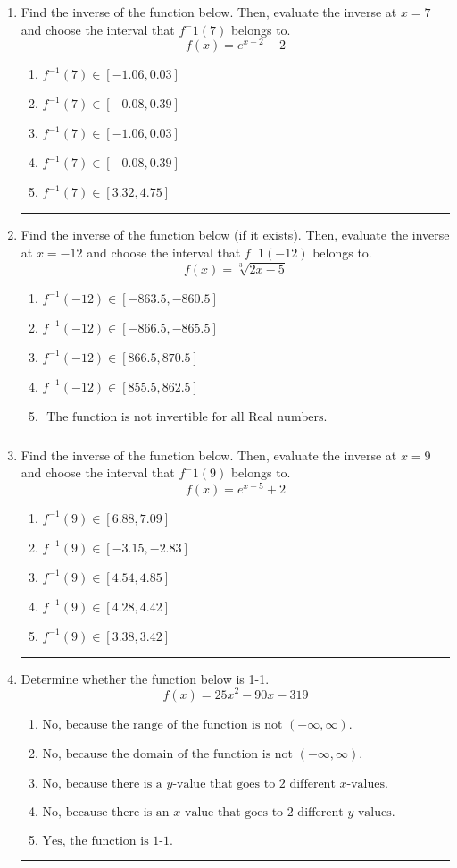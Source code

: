 \documentclass[14pt]{extbook}
\newcommand{\litem}[1]{\item#1\hspace*{-1cm}\rule{\textwidth}{0.4pt}}
\begin{document}
\begin{enumerate}
{\begin{enumerate}[label=\Alph*.]
\end{enumerate} }
\litem{
Find the inverse of the function below. Then, evaluate the inverse at $x = 7$ and choose the interval that $f^-1(7)$ belongs to.\[ f(x) = e^{x-2}-2 \]\begin{enumerate}[label=\Alph*.]
\item \( f^{-1}(7) \in [-1.06, 0.03] \)
\item \( f^{-1}(7) \in [-0.08, 0.39] \)
\item \( f^{-1}(7) \in [-1.06, 0.03] \)
\item \( f^{-1}(7) \in [-0.08, 0.39] \)
\item \( f^{-1}(7) \in [3.32, 4.75] \)

\end{enumerate} }
\litem{
Find the inverse of the function below (if it exists). Then, evaluate the inverse at $x = -12$ and choose the interval that $f^-1(-12)$ belongs to.\[ f(x) = \sqrt[3]{2 x - 5} \]\begin{enumerate}[label=\Alph*.]
\item \( f^{-1}(-12) \in [-863.5, -860.5] \)
\item \( f^{-1}(-12) \in [-866.5, -865.5] \)
\item \( f^{-1}(-12) \in [866.5, 870.5] \)
\item \( f^{-1}(-12) \in [855.5, 862.5] \)
\item \( \text{ The function is not invertible for all Real numbers. } \)

\end{enumerate} }
\litem{
Find the inverse of the function below. Then, evaluate the inverse at $x = 9$ and choose the interval that $f^-1(9)$ belongs to.\[ f(x) = e^{x-5}+2 \]\begin{enumerate}[label=\Alph*.]
\item \( f^{-1}(9) \in [6.88, 7.09] \)
\item \( f^{-1}(9) \in [-3.15, -2.83] \)
\item \( f^{-1}(9) \in [4.54, 4.85] \)
\item \( f^{-1}(9) \in [4.28, 4.42] \)
\item \( f^{-1}(9) \in [3.38, 3.42] \)

\end{enumerate} }
\litem{
Determine whether the function below is 1-1.\[ f(x) = 25 x^2 - 90 x - 319 \]\begin{enumerate}[label=\Alph*.]
\item \( \text{No, because the range of the function is not $(-\infty, \infty)$.} \)
\item \( \text{No, because the domain of the function is not $(-\infty, \infty)$.} \)
\item \( \text{No, because there is a $y$-value that goes to 2 different $x$-values.} \)
\item \( \text{No, because there is an $x$-value that goes to 2 different $y$-values.} \)
\item \( \text{Yes, the function is 1-1.} \)


\end{enumerate}}
\end{enumerate}
\end{document}
